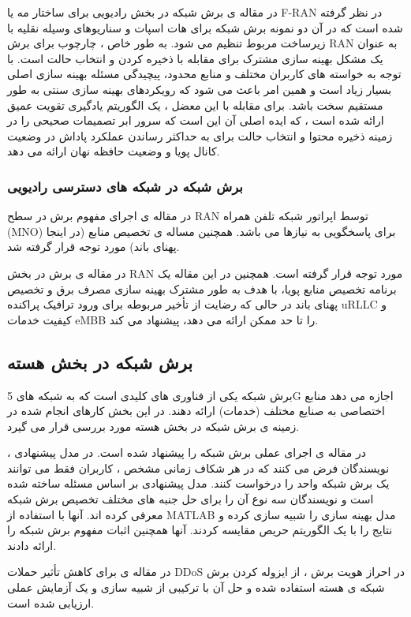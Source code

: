 در مقاله ی 
\cite{fran}
برش شبکه در بخش رادیویی برای ساختار مه 
 یا F-RAN
  در نظر گرفته شده است که در آن دو نمونه برش شبکه برای هات اسپات و سناریوهای وسیله نقلیه با زیرساخت مربوط تنظیم می شود. به طور خاص ، چارچوب برای برش RAN به عنوان یک مشکل بهینه سازی مشترک برای مقابله با ذخیره کردن و انتخاب حالت است.
  با توجه به خواسته های کاربران مختلف و منابع محدود، پیچیدگی مسئله بهینه سازی اصلی بسیار زیاد است و همین امر باعث می شود که رویکردهای بهینه سازی سنتی به طور مستقیم سخت باشد.
 برای مقابله با این معضل ، یک الگوریتم یادگیری تقویت عمیق ارائه شده است ، که ایده اصلی آن این است که سرور ابر تصمیمات صحیحی را در زمینه ذخیره محتوا و انتخاب حالت برای به حداکثر رساندن عملکرد پاداش در وضعیت کانال پویا و وضعیت حافظه نهان ارائه می دهد.
\subsubsection{برش شبکه در شبکه های دسترسی رادیویی }
در مقاله ی 
\cite{ranSlice, ranSlice1}
اجرای مفهوم برش در سطح RAN توسط اپراتور شبکه تلفن همراه (MNO) برای پاسخگویی به نیازها می باشد. همچنین مساله ی تخصیص منابع (در اینجا پهنای باند) مورد توجه قرار گرفته شد.


در مقاله ی 
\cite{ranslice2}
برش در بخش RAN مورد توجه قرار گرفته است.
همچنین
در این مقاله یک برنامه تخصیص منابع پویا، با هدف به طور مشترک بهینه سازی مصرف برق و تخصیص پهنای باند در حالی که رضایت از تأخیر مربوطه برای ورود ترافیک پراکنده uRLLC و کیفیت خدمات eMBB را تا حد ممکن ارائه می دهد، پیشنهاد می کند.

\subsection{برش شبکه در بخش هسته  }
برش شبکه یکی از فناوری های کلیدی است که به شبکه های 5G اجازه می دهد منابع اختصاصی به صنایع مختلف (خدمات) ارائه دهند.
 در این بخش 
 کارهای انجام شده در زمینه ی
 برش شبکه در بخش هسته 
 مورد بررسی قرار می گیرد.


در مقاله ی 
\cite{onet}
اجرای عملی برش شبکه را پیشنهاد شده است.
در مدل پیشنهادی ، نویسندگان فرض می کنند که در هر شکاف زمانی مشخص ، کاربران فقط می توانند یک برش شبکه واحد را درخواست کنند.
مدل پیشنهادی بر اساس مسئله  ساخته شده است و نویسندگان سه نوع  آن را برای حل جنبه های مختلف تخصیص برش شبکه معرفی کرده اند.
آنها با استفاده از MATLAB مدل بهینه سازی را شبیه سازی کرده و نتایج را با یک الگوریتم حریص مقایسه کردند. آنها همچنین اثبات مفهوم برش شبکه را ارائه دادند.


در مقاله ی
\citep{vnf1}
برای کاهش تأثیر حملات DDoS در احراز هویت برش ، از ایزوله کردن برش شبکه ی هسته استفاده شده و حل آن با ترکیبی از شبیه سازی و یک آزمایش عملی ارزیابی شده است.


